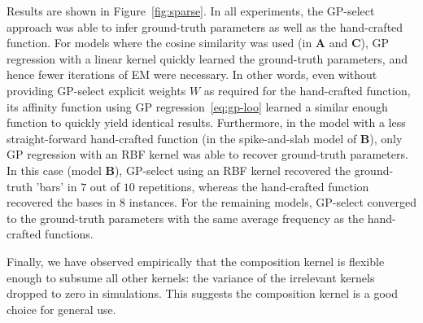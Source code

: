 Results are shown in Figure~\ref{fig:sparse}.
In all experiments, the GP-select approach was able to infer ground-truth parameters as well as the hand-crafted function.
For models where the cosine similarity was used (in \textbf{A} and \textbf{C}), GP regression with a linear kernel quickly learned the ground-truth parameters, and hence fewer iterations of EM were necessary.
In other words, even without providing GP-select explicit weights $W$ as required for the hand-crafted function, its affinity function using GP regression~\eqref{eq:gp-loo} learned a similar enough function to quickly yield identical results.
Furthermore, in the model with a less straight-forward hand-crafted function (in the spike-and-slab model of \textbf{B}), only GP regression with an RBF kernel was able to recover ground-truth parameters.
In this case (model \textbf{B}), GP-select using an RBF kernel recovered the ground-truth 'bars' in $7$ out of $10$ repetitions, whereas the hand-crafted function recovered the bases in $8$ instances.
For the remaining models, GP-select converged to the ground-truth parameters with the same average frequency as the hand-crafted functions.


Finally, we have observed empirically that the composition kernel is flexible enough to subsume all other kernels:
the variance of the irrelevant kernels dropped to zero in simulations.
This suggests the composition kernel is a good choice  for general use. 


